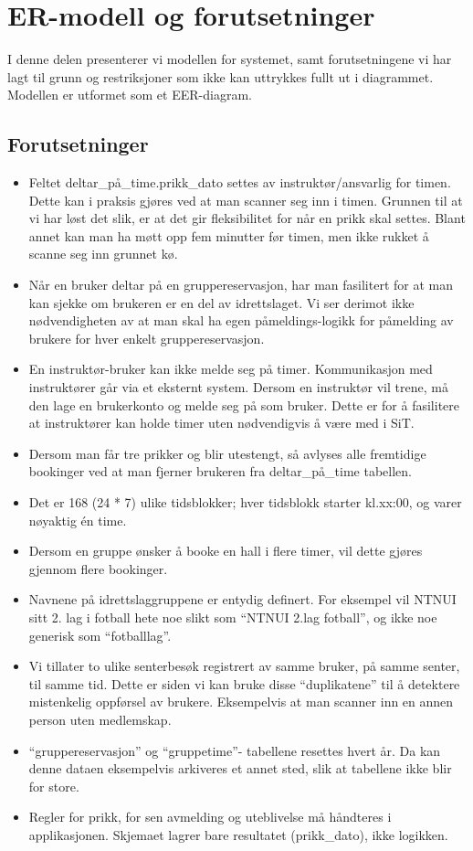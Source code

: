 \section{ER-modell og forutsetninger}

I denne delen presenterer vi modellen for systemet, samt forutsetningene vi har lagt til grunn og restriksjoner som ikke kan uttrykkes fullt ut i diagrammet. Modellen er utformet som et EER-diagram.

\subsection*{Forutsetninger}
\begin{itemize}
    \item Feltet deltar\_på\_time.prikk\_dato settes av instruktør/ansvarlig for timen. Dette kan i praksis gjøres ved at man scanner seg inn i timen. Grunnen til at vi har løst det slik, er at det gir fleksibilitet for når en prikk skal settes. Blant annet kan man ha møtt opp fem minutter før timen, men ikke rukket å scanne seg inn grunnet kø.
    \item Når en bruker deltar på en gruppereservasjon, har man fasilitert for at man kan sjekke om brukeren er en del av idrettslaget. Vi ser derimot ikke nødvendigheten av at man skal ha egen påmeldings-logikk for påmelding av brukere for hver enkelt gruppereservasjon.
    \item En instruktør-bruker kan ikke melde seg på timer. Kommunikasjon med instruktører går via et eksternt system. Dersom en instruktør vil trene, må den lage en brukerkonto og melde seg på som bruker. Dette er for å fasilitere at instruktører kan holde timer uten nødvendigvis å være med i SiT.
    \item Dersom man får tre prikker og blir utestengt, så avlyses alle fremtidige bookinger ved at man fjerner brukeren fra deltar\_på\_time tabellen.
    \item Det er 168 (24 * 7) ulike tidsblokker; hver tidsblokk starter kl.xx:00, og varer nøyaktig én time.
    \item Dersom en gruppe ønsker å booke en hall i flere timer, vil dette gjøres gjennom flere bookinger.
    \item Navnene på idrettslaggruppene er entydig definert. For eksempel vil NTNUI sitt 2. lag i fotball hete noe slikt som “NTNUI 2.lag fotball”, og ikke noe generisk som “fotballlag”.
    \item Vi tillater to ulike senterbesøk registrert av samme bruker, på samme senter, til samme tid. Dette er siden vi kan bruke disse “duplikatene” til å detektere mistenkelig oppførsel av brukere. Eksempelvis at man scanner inn en annen person uten medlemskap.
    \item “gruppereservasjon” og “gruppetime”- tabellene resettes hvert år. Da kan denne dataen eksempelvis arkiveres et annet sted, slik at tabellene ikke blir for store.
    \item Regler for prikk, for sen avmelding og uteblivelse må håndteres i applikasjonen. Skjemaet lagrer bare resultatet (prikk\_dato), ikke logikken.
\end{itemize}


